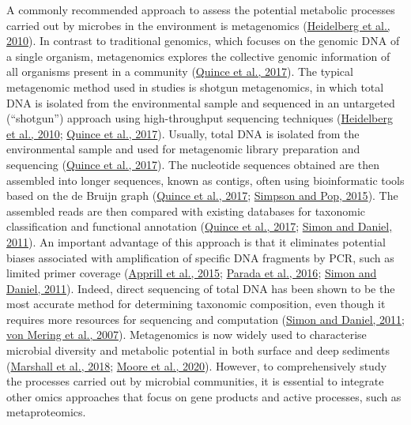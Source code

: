 \documentclass[
  12 pt,
]{book}
\begin{document}
A commonly recommended approach to assess the potential metabolic processes carried out by microbes in the environment is metagenomics (\protect\hyperlink{ref-Heidelberg2010}{Heidelberg et al., 2010}). In contrast to traditional genomics, which focuses on the genomic DNA of a single organism, metagenomics explores the collective genomic information of all organisms present in a community (\protect\hyperlink{ref-Quince2017}{Quince et al., 2017}). The typical metagenomic method used in studies is shotgun metagenomics, in which total DNA is isolated from the environmental sample and sequenced in an untargeted (``shotgun'') approach using high-throughput sequencing techniques (\protect\hyperlink{ref-Heidelberg2010}{Heidelberg et al., 2010}; \protect\hyperlink{ref-Quince2017}{Quince et al., 2017}). Usually, total DNA is isolated from the environmental sample and used for metagenomic library preparation and sequencing (\protect\hyperlink{ref-Quince2017}{Quince et al., 2017}). The nucleotide sequences obtained are then assembled into longer sequences, known as contigs, often using bioinformatic tools based on the de Bruijn graph (\protect\hyperlink{ref-Quince2017}{Quince et al., 2017}; \protect\hyperlink{ref-Simpson2015}{Simpson and Pop, 2015}). The assembled reads are then compared with existing databases for taxonomic classification and functional annotation (\protect\hyperlink{ref-Quince2017}{Quince et al., 2017}; \protect\hyperlink{ref-Simon2011}{Simon and Daniel, 2011}). An important advantage of this approach is that it eliminates potential biases associated with amplification of specific DNA fragments by PCR, such as limited primer coverage (\protect\hyperlink{ref-Apprill2015}{Apprill et al., 2015}; \protect\hyperlink{ref-Parada2016}{Parada et al., 2016}; \protect\hyperlink{ref-Simon2011}{Simon and Daniel, 2011}). Indeed, direct sequencing of total DNA has been shown to be the most accurate method for determining taxonomic composition, even though it requires more resources for sequencing and computation (\protect\hyperlink{ref-Simon2011}{Simon and Daniel, 2011}; \protect\hyperlink{ref-vonMering2007}{von Mering et al., 2007}). Metagenomics is now widely used to characterise microbial diversity and metabolic potential in both surface and deep sediments (\protect\hyperlink{ref-Marshall2018}{Marshall et al., 2018}; \protect\hyperlink{ref-Moore2020}{Moore et al., 2020}). However, to comprehensively study the processes carried out by microbial communities, it is essential to integrate other omics approaches that focus on gene products and active processes, such as metaproteomics.
\end{document}
